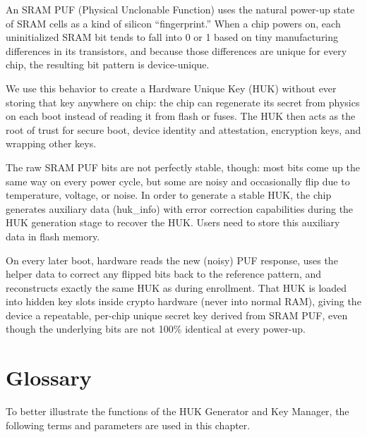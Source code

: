 \documentclass[main\_\_EN.tex]{subfiles}
\begin{document}
An SRAM PUF (Physical Unclonable Function) uses the natural power-up state of SRAM cells as a kind of silicon “fingerprint.” When a chip powers on, each uninitialized SRAM bit tends to fall into 0 or 1 based on tiny manufacturing differences in its transistors, and because those differences are unique for every chip, the resulting bit pattern is device-unique.

We use this behavior to create a Hardware Unique Key (HUK) without ever storing that key anywhere on chip: the chip can regenerate its secret from physics on each boot instead of reading it from flash or fuses. The HUK then acts as the root of trust for secure boot, device identity and attestation, encryption keys, and wrapping other keys.

The raw SRAM PUF bits are not perfectly stable, though: most bits come up the same way on every power cycle, but some are noisy and occasionally flip due to temperature, voltage, or noise. In order to generate a stable HUK, the chip generates auxiliary data (huk\_info) with error correction capabilities during the HUK generation stage to recover the HUK. Users need to store this auxiliary data in flash memory.

On every later boot, hardware reads the new (noisy) PUF response, uses the helper data to correct any flipped bits back to the reference pattern, and reconstructs exactly the same HUK as during enrollment. That HUK is loaded into hidden key slots inside crypto hardware (never into normal RAM), giving the device a repeatable, per-chip unique secret key derived from SRAM PUF, even though the underlying bits are not 100\% identical at every power-up.


\section{Glossary}

To better illustrate the functions of the HUK Generator and Key Manager, the following terms and parameters are used in this chapter.
\end{document}
